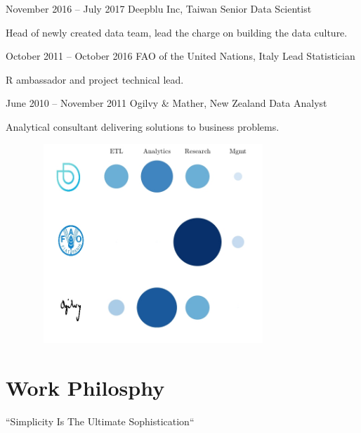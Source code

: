 \documentclass{tccv}
\begin{document}
\begin{eventlist}

\item{November 2016 -- July 2017}
  {Deepblu Inc, Taiwan}
  {Senior Data Scientist}

  Head of newly created data team, lead the charge on building the
  data culture.


\item{October 2011 -- October 2016}
  {FAO of the United Nations, Italy}
  {Lead Statistician}

  R ambassador and project technical lead.\\
  
\item{June 2010 -- November 2011}
  {Ogilvy \& Mather, New Zealand}
  {Data Analyst}
  
  Analytical consultant delivering solutions to business
  problems. \\


\end{eventlist}

\begin{figure}[h!] %
  \centering
  \includegraphics[width=9cm,height=7.5cm]{experience_association.jpeg}
\end{figure}



\section{Work Philosphy}

``Simplicity Is The Ultimate Sophistication``
\end{document}
